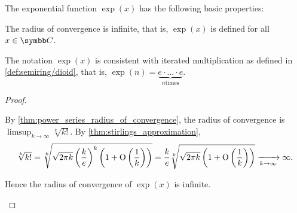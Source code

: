\begin{proposition}\label{thm:exponential_function_properties}
  The exponential function \( \exp(x) \) has the following basic properties:

  \begin{thmenum}
     The radius of convergence is infinite, that is, \( \exp(x) \) is defined for all \( x \in \C \).

     The notation \( \exp(x) \) is consistent with iterated multiplication as defined in \cref{def:semiring/dioid}, that is, \( \exp(n) = \underbrace{e \cdot \ldots \cdot e}_{n \text{times}} \).
  \end{thmenum}
\end{proposition}
\begin{proof}
  \begin{description}
     By \cref{thm:power_series_radius_of_convergence}, the radius of convergence is \( \limsup_{k \to \infty} \sqrt[k]{k!} \). By \cref{thm:stirlings_approximation},
    \begin{equation*}
      \sqrt[k]{k!}
      =
      \sqrt[k]{\sqrt{2 \pi k} \left(\frac k e \right)^k \left(1 + \operatorname{O} \left(\frac 1 k \right) \right)}
      =
      \frac k e \sqrt[k]{\sqrt{2 \pi k} \left(1 + \operatorname{O} \left(\frac 1 k \right) \right)}
      \xrightarrow[k \to \infty]{} \infty.
    \end{equation*}

    Hence the radius of convergence of \( \exp(x) \) is infinite.
  \end{description}
\end{proof}

